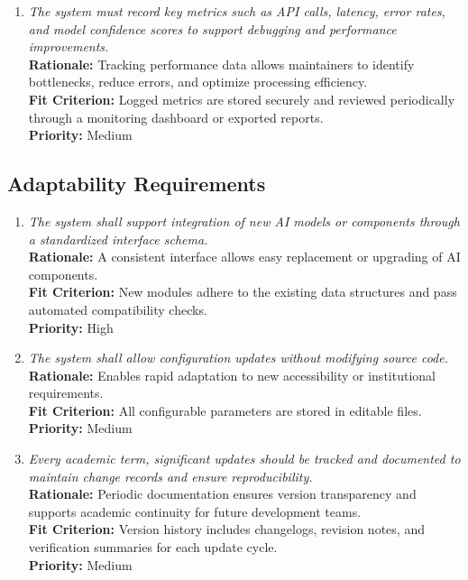 \documentclass[12pt]{article}
\begin{document}
\begin{enumerate}[label=MS-SUP\arabic*., wide=0pt, leftmargin=*]

  \item \emph{The system must record key metrics such as API calls, latency, error rates, and model confidence scores to support debugging and performance improvements.}\\[2mm]
    {\bf Rationale:} Tracking performance data allows maintainers to identify bottlenecks, reduce errors, and optimize processing efficiency.\\
    {\bf Fit Criterion:} Logged metrics are stored securely and reviewed periodically through a monitoring dashboard or exported reports.\\
    {\bf Priority:} Medium
\end{enumerate}

\subsection{Adaptability Requirements}

\begin{enumerate}[label=MS-AD\arabic*., wide=0pt, leftmargin=*]
  \item \emph{The system shall support integration of new AI models
    or components through a standardized interface schema.}\\[2mm]
    {\bf Rationale:} A consistent interface allows easy replacement
    or upgrading of AI components.\\
    {\bf Fit Criterion:} New modules adhere to the existing data
    structures and pass automated compatibility checks.\\
    {\bf Priority:} High

  \item \emph{The system shall allow configuration updates without
    modifying source code.}\\[2mm]
    {\bf Rationale:} Enables rapid adaptation to new accessibility or
    institutional requirements.\\
    {\bf Fit Criterion:} All configurable parameters are stored in
    editable files.\\
    {\bf Priority:} Medium

  \item \emph{Every academic term, significant updates should be tracked and documented to maintain change records and ensure reproducibility.}\\[2mm]
    {\bf Rationale:} Periodic documentation ensures version transparency and supports academic continuity for future development teams.\\
    {\bf Fit Criterion:} Version history includes changelogs, revision notes, and verification summaries for each update cycle.\\
    {\bf Priority:} Medium
\end{enumerate}
\end{document}
